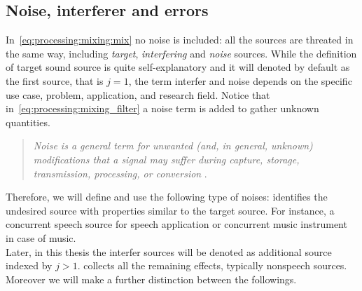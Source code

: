 \subsection{Noise, interferer and errors}
In~\cref{eq:processing:mixing:mix} no noise is included:
all the sources are threated in the same way, including \textit{target}, \textit{interfering} and \textit{noise} sources.
While the definition of target sound source is quite self-explanatory and it will denoted by default as the first source, that is $j = 1$,
the term interfer and noise depends on the specific use case, problem, application, and research field.
Notice that in~\cref{eq:processing:mixing_filter} a noise term is added to gather unknown quantities.
\begin{quote}
    \textit{\emph{Noise} is a general term for unwanted (and, in general, unknown) modifications that a signal may suffer during capture, storage, transmission, processing, or conversion}
    .
\end{quote}
Therefore, we will define and use the following type of noises:
 identifies the undesired source with properties similar to the target source.
For instance, a concurrent speech source for speech application or concurrent music instrument in case of music.
\\Later, in this thesis the interfer sources will be denoted as additional source indexed by $j > 1$.
 collects all the remaining effects, typically nonspeech sources. Moreover we will make a further distinction between the followings.

